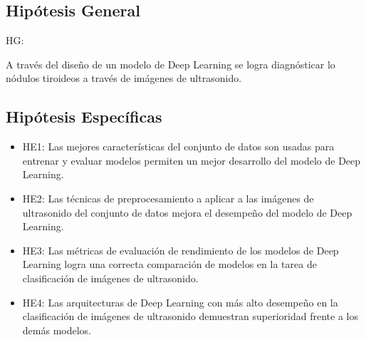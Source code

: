 \subsection{Hipótesis General}
HG: \newcommand{\HipotesisGeneral}{
A través del diseño de un modelo de Deep Learning se logra diagnósticar lo nódulos tiroideos a través de imágenes de ultrasonido.
}
\HipotesisGeneral


\subsection{Hipótesis Específicas}
\newcommand{\Hone}{
Las mejores características del conjunto de datos son usadas para entrenar y evaluar  modelos permiten un mejor desarrollo del modelo de Deep Learning.
}
\newcommand{\Htwo}{
Las técnicas de preprocesamiento a aplicar a las imágenes de ultrasonido del conjunto de datos mejora el desempeño del modelo de Deep Learning.
}
\newcommand{\Hthree}{
Las métricas de evaluación de rendimiento de los modelos de Deep Learning logra una correcta comparación de modelos en la tarea de clasificación de imágenes de ultrasonido.
}
\newcommand{\Hfour}{
    Las arquitecturas de Deep Learning con más alto desempeño en la clasificación de imágenes de ultrasonido demuestran superioridad frente a los demás modelos.
}

\begin{itemize}
	\item HE1: {\Hone}
	\item HE2: {\Htwo}
	\item HE3: {\Hthree}
	\item HE4: {\Hfour}
\end{itemize}